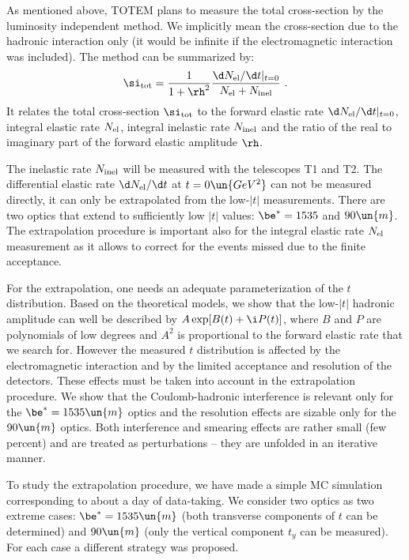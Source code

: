 \vskip1mm
As mentioned above, TOTEM plans to measure the total cross-section by the luminosity independent method. We implicitly mean the cross-section due to the hadronic interaction only (it would be infinite if the electromagnetic interaction was included). The method can be summarized by:
$$
	\si_{\rm tot} = {1\over 1+\rh^2} {\d N_{\rm el}/\d t|_{t=0}\over N_{\rm el} + N_{\rm inel}}\ .
$$
It relates the total cross-section $\si_{\rm tot}$ to the forward elastic rate $\d N_{\rm el}/\d t|_{t=0}$, integral elastic rate $N_{\rm el}$, integral inelastic rate $N_{\rm inel}$ and the ratio of the real to imaginary part of the forward elastic amplitude $\rh$.

The inelastic rate $N_{\rm inel}$ will be measured with the telescopes T1 and T2.
The differential elastic rate $\d N_{\rm el}/\d t$ at $t=0\un{GeV^2}$ can not be measured directly, it can only be extrapolated from the low-$|t|$ measurements. There are two optics that extend to sufficiently low $|t|$ values: $\be^* = 1535$ and $90\un{m}$. The extrapolation procedure is important also for the integral elastic rate $N_{\rm el}$ measurement as it allows to correct for the events missed due to the finite acceptance.

For the extrapolation, one needs an adequate parameterization of the $t$ distribution. Based on the theoretical models, we show that the low-$|t|$ hadronic amplitude can well be described by $A \exp[B(t) + \i P(t)]$, where $B$ and $P$ are polynomials of low degrees and $A^2$ is proportional to the  forward elastic rate that we search for. However the measured $t$ distribution is affected by the electromagnetic interaction and by the limited acceptance and resolution of the detectors. These effects must be taken into account in the extrapolation procedure. We show that the Coulomb-hadronic interference is relevant only for the $\be^*=1535\un{m}$ optics and the resolution effects are sizable only for the $90\un{m}$ optics. Both interference and smearing effects are rather small (few percent) and are treated as perturbations -- they are unfolded in an iterative manner.

To study the extrapolation procedure, we have made a simple MC simulation corresponding to about a day of data-taking. We consider two optics as two extreme cases: $\be^* = 1535\un{m}$ (both transverse components of $t$ can be determined) and $90\un{m}$ (only the vertical component $t_y$ can be measured). For each case a different strategy was proposed.


